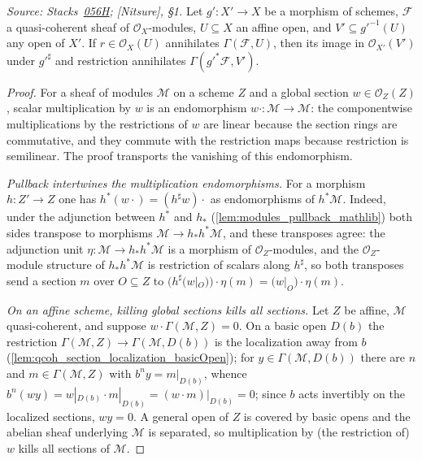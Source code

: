 \begin{lemma}
  \label{lem:annihilator_pullback_sections}
  \textit{Source:
  Stacks~\href{https://stacks.math.columbia.edu/tag/056H}{056H};
  [Nitsure], \S 1.}
  Let \(g' : X' \to X\) be a morphism of schemes, \(\mathcal{F}\) a
  quasi-coherent sheaf of \(\mathcal{O}_X\)-modules, \(U \subseteq X\) an
  affine open, and \(V' \subseteq g'^{-1}(U)\) any open of \(X'\).  If
  \(r \in \mathcal{O}_X(U)\) annihilates \(\Gamma(\mathcal{F}, U)\), then its
  image in \(\mathcal{O}_{X'}(V')\) under \(g'^\sharp\) and restriction
  annihilates \(\Gamma(g'^* \mathcal{F}, V')\).
\end{lemma}
\begin{proof}\leanok
  For a sheaf of modules \(\mathcal{M}\) on a scheme \(Z\) and a global
  section \(w \in \mathcal{O}_Z(Z)\), scalar multiplication by \(w\) is an
  endomorphism \(w \cdot : \mathcal{M} \to \mathcal{M}\): the componentwise
  multiplications by the restrictions of \(w\) are linear because the section
  rings are commutative, and they commute with the restriction maps because
  restriction is semilinear.  The proof transports the vanishing of this
  endomorphism.

  \emph{Pullback intertwines the multiplication endomorphisms.}  For a
  morphism \(h : Z' \to Z\) one has \(h^*(w \cdot) = (h^\sharp w) \cdot\) as
  endomorphisms of \(h^* \mathcal{M}\).  Indeed, under the adjunction between
  \(h^*\) and \(h_*\) (\cref{lem:modules_pullback_mathlib}) both sides
  transpose to morphisms \(\mathcal{M} \to h_* h^* \mathcal{M}\), and these
  transposes agree: the adjunction unit
  \(\eta : \mathcal{M} \to h_* h^* \mathcal{M}\) is a morphism of
  \(\mathcal{O}_Z\)-modules, and the \(\mathcal{O}_Z\)-module structure of
  \(h_* h^* \mathcal{M}\) is restriction of scalars along \(h^\sharp\), so
  both transposes send a section \(m\) over \(O \subseteq Z\) to
  \(\bigl(h^\sharp(w|_O)\bigr) \cdot \eta(m) = \bigl(w|_O\bigr) \cdot
  \eta(m)\).

  \emph{On an affine scheme, killing global sections kills all sections.}
  Let \(Z\) be affine, \(\mathcal{M}\) quasi-coherent, and suppose
  \(w \cdot \Gamma(\mathcal{M}, Z) = 0\).  On a basic open \(D(b)\) the
  restriction \(\Gamma(\mathcal{M}, Z) \to \Gamma(\mathcal{M}, D(b))\) is the
  localization away from \(b\)
  (\cref{lem:qcoh_section_localization_basicOpen}); for
  \(y \in \Gamma(\mathcal{M}, D(b))\) there are \(n\) and
  \(m \in \Gamma(\mathcal{M}, Z)\) with \(b^n y = m|_{D(b)}\), whence
  \(b^n (w y) = w|_{D(b)} \cdot m|_{D(b)} = (w \cdot m)|_{D(b)} = 0\); since
  \(b\) acts invertibly on the localized sections, \(w y = 0\).  A general
  open of \(Z\) is covered by basic opens and the abelian sheaf underlying
  \(\mathcal{M}\) is separated, so multiplication by (the restriction of)
  \(w\) kills all sections of \(\mathcal{M}\).


\end{proof}
